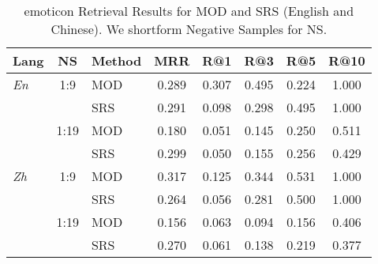 
\begin{table}[htbp]
\centering
\caption{emoticon Retrieval Results for MOD and SRS (English and Chinese). We shortform Negative Samples for NS.}
\begin{tabular}{lclccccc}
\toprule
Lang & NS & Method & MRR & R@1 & R@3 & R@5 & R@10 \\ \midrule
 \textit{En} & 1:9 & MOD  & 0.289 & 0.307 & 0.495 & 0.224 & 1.000  \\
  & & SRS  & 0.291 & 0.098 & 0.298 & 0.495 & 1.000 \\  \cmidrule(lr){2-8} 
 &  1:19 & MOD & 0.180 & 0.051 & 0.145 & 0.250 & 0.511 \\ 
 &  & SRS & 0.299  & 0.050 & 0.155 & 0.256 & 0.429 \\ \hline
 
 
\textit{Zh}  &  1:9 & MOD  & 0.317 & 0.125 & 0.344 & 0.531 & 1.000  \\
& & SRS   & 0.264 & 0.056 & 0.281 & 0.500 & 1.000 \\ \cmidrule(lr){2-8} 
 &  1:19 & MOD & 0.156 & 0.063 & 0.094 & 0.156 & 0.406  \\ 
 &  & SRS & 0.270 & 0.061 & 0.138 & 0.219 & 0.377  \\


\end{tabular}
\end{table}
